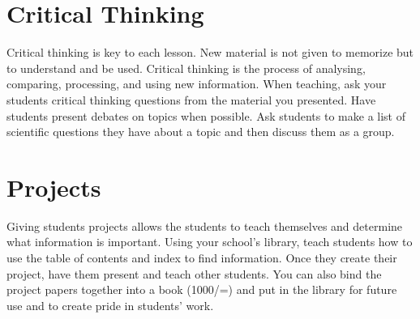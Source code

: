 \section{Critical Thinking}
Critical thinking is key to each lesson.  New material is not given to memorize but to understand and be used. Critical thinking is the process of analysing, comparing, processing, and using new information. When teaching, ask your students critical thinking questions from the material you presented.  Have students present debates on topics when possible.  Ask students to make a list of scientific questions they have about a topic and then discuss them as a group.

\section{Projects}
Giving students projects allows the students to teach themselves and determine what information is important. Using your school's library, teach students how to use the table of contents and index to find information. Once they create their project, have them present and teach other students. You can also bind the project papers together into a book (1000/=) and put in the library for future use and to create pride in students' work.
